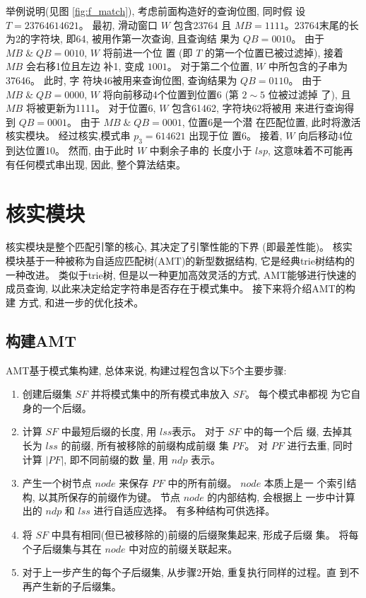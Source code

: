 举例说明(见图 \ref{fig:f_match}), 考虑前面构造好的查询位图, 同时假
设 $T=23764614621$。  最初, 滑动窗口 $W$ 包含23764 且
$MB = 1111$。23764末尾的长为2的字符块, 即64, 被用作第一次查询, 且查询结
果为 $QB=0010$。 由于 $MB\; \&\; QB = 0010$, $W$ 将前进一个位
置 (即 $T$ 的第一个位置已被过滤掉), 接着 $MB$ 会右移1位且左边
补1, 变成 $1001$。 对于第二个位置, $W$ 中所包含的子串为37646。 此时, 字
符块46被用来查询位图, 查询结果为 $QB=0110$。 由于 $MB\; \& \;
QB=0000$, $W$ 将向前移动4个位置到位置6 (第 $2 \sim 5$ 位被过滤掉
了), 且 $MB$ 将被更新为1111。 对于位置6, $W$ 包含61462, 字符块62将被用
来进行查询得到 $QB = 0001$。 由于 $MB\; \& \; QB = 0001$, 位置6是一个潜
在匹配位置, 此时将激活核实模块。 经过核实,模式串 $p_3=614621$ 出现于位
置6。 接着, $W$ 向后移动4位到达位置10。 然而, 由于此时 $W$ 中剩余子串的
长度小于 $lsp$, 这意味着不可能再有任何模式串出现, 因此, 整个算法结束。

\section{核实模块}
\label{sec:verification}

核实模块是整个匹配引擎的核心, 其决定了引擎性能的下界 (即最差性能)。 核实
模块基于一种被称为自适应匹配树(AMT)的新型数据结构, 它是经典trie树结构的
一种改进。 类似于trie树, 但是以一种更加高效灵活的方式, AMT能够进行快速的
成员查询, 以此来决定给定字符串是否存在于模式集中。 接下来将介绍AMT的构建
方式, 和进一步的优化技术。

\subsection{构建AMT}
\label{subsec:amt}

AMT基于模式集构建, 总体来说, 构建过程包含以下5个主要步骤:

\begin{enumerate}
\item 创建后缀集 $SF$ 并将模式集中的所有模式串放入 $SF$。 每个模式串都视
  为它自身的一个后缀。
\item 计算 $SF$ 中最短后缀的长度, 用 $lss$表示。 对于 $SF$ 中的每一个后
  缀, 去掉其长为 $lss$ 的前缀, 所有被移除的前缀构成前缀
  集 $PF$。 对 $PF$ 进行去重, 同时计算 $|PF|$, 即不同前缀的数
  量, 用 $ndp$ 表示。
\item 产生一个树节点 $node$ 来保存 $PF$ 中的所有前缀。 $node$ 本质上是一
  个索引结构, 以其所保存的前缀作为键。 节点 $node$ 的内部结构, 会根据上
  一步中计算出的 $ndp$ 和 $lss$ 进行自适应选择。 有多种结构可供选择。
\item 将 $SF$ 中具有相同(但已被移除的)前缀的后缀聚集起来, 形成子后缀
  集。 将每个子后缀集与其在 $node$ 中对应的前缀关联起来。
\item 对于上一步产生的每个子后缀集, 从步骤2开始, 重复执行同样的过程。直
  到不再产生新的子后缀集。
\end{enumerate}

